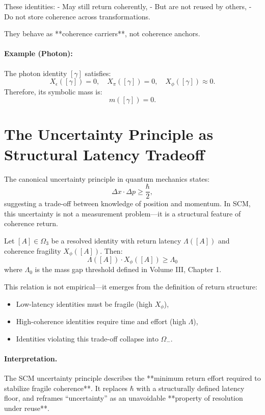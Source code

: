 These identities:
- May still return coherently,
- But are not reused by others,
- Do not store coherence across transformations.

They behave as **coherence carriers**, not coherence anchors.

\paragraph{Example (Photon):}
The photon identity $[\gamma]$ satisfies:
\[
X_\epsilon([\gamma]) = 0, \quad X_\pi([\gamma]) = 0, \quad X_\phi([\gamma]) \approx 0.
\]
Therefore, its symbolic mass is:
\[
m([\gamma]) = 0.
\]

\section{The Uncertainty Principle as Structural Latency Tradeoff} \label{sec:uncertainty-scm}

The canonical uncertainty principle in quantum mechanics states:
\[
\Delta x \cdot \Delta p \geq \frac{\hbar}{2},
\]
suggesting a trade-off between knowledge of position and momentum. In SCM, this uncertainty is not a measurement problem—it is a structural feature of coherence return.

\begin{definition}
Let $[A] \in \Omega_3$ be a resolved identity with return latency $\Lambda([A])$ and coherence fragility $X_\phi([A])$. Then:
\[
\Lambda([A]) \cdot X_\phi([A]) \geq \Lambda_0
\]
where $\Lambda_0$ is the mass gap threshold defined in Volume III, Chapter 1.
\end{definition}

\noindent This relation is not empirical—it emerges from the definition of return structure:
\begin{itemize}
    \item Low-latency identities must be fragile (high $X_\phi$),
    \item High-coherence identities require time and effort (high $\Lambda$),
    \item Identities violating this trade-off collapse into $\Omega_-$.
\end{itemize}

\paragraph{Interpretation.}
The SCM uncertainty principle describes the **minimum return effort required to stabilize fragile coherence**. It replaces $\hbar$ with a structurally defined latency floor, and reframes “uncertainty” as an unavoidable **property of resolution under reuse**.

